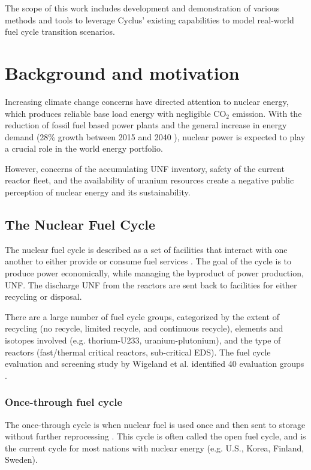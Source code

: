 The scope of this work includes development and demonstration of
various methods and tools to leverage Cyclus' existing
capabilities to model real-world fuel cycle transition scenarios.

\section{Background and motivation}
Increasing climate change concerns have directed attention
to nuclear energy, which produces reliable base load energy
with negligible CO$_2$ emission. With the reduction of fossil
fuel based power plants and the general increase in energy demand
(28\% growth between 2015 and 2040 \cite{conti_international_2016}),
nuclear power is expected to play a crucial role in the world energy portfolio.

However, concerns of the accumulating \gls{UNF} inventory,
safety of the current reactor fleet, and the availability of
uranium resources create a negative public perception of
nuclear energy and its sustainability.

\subsection{The Nuclear Fuel Cycle}
The nuclear fuel cycle is described as a set of facilities
that interact with one another to either provide or consume
fuel services \cite{gidden_agent-based_2015}. The goal of
the cycle is to produce power economically, while managing
the byproduct of power production, \gls{UNF}. The discharge
\gls{UNF} from the reactors are sent back to facilities for
either recycling or disposal. 

There are a large number of fuel cycle groups, categorized by the extent of recycling
(no recycle, limited recycle, and continuous recycle), elements and isotopes involved
(e.g. thorium-U233, uranium-plutonium), and the type of reactors (fast/thermal critical
reactors, sub-critical \gls{EDS}). The fuel cycle evaluation and screening study by
Wigeland et al. identified 40 evaluation groups \cite{wigeland_nuclear_2014}.

\subsubsection{Once-through fuel cycle}

The once-through cycle is when nuclear fuel is used once and then sent to 
storage without further reprocessing \cite{tsoulfanidis_nuclear_2013}.
This cycle is often called the open fuel cycle, and is the current cycle for
most nations with nuclear energy (e.g. U.S., Korea, Finland, Sweden).

